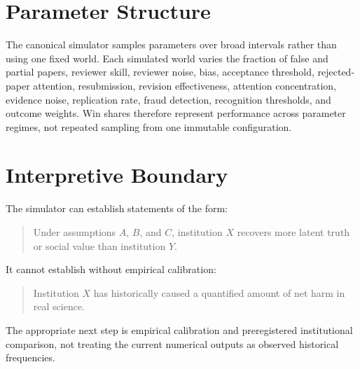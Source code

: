 \documentclass[11pt]{article}
\begin{document}
\appendix
\section{Parameter Structure}

The canonical simulator samples parameters over broad intervals rather than using one fixed world. Each simulated world varies the fraction of false and partial papers, reviewer skill, reviewer noise, bias, acceptance threshold, rejected-paper attention, resubmission, revision effectiveness, attention concentration, evidence noise, replication rate, fraud detection, recognition thresholds, and outcome weights. Win shares therefore represent performance across parameter regimes, not repeated sampling from one immutable configuration.

\section{Interpretive Boundary}

The simulator can establish statements of the form:

\begin{quote}
Under assumptions $A$, $B$, and $C$, institution $X$ recovers more latent truth or social value than institution $Y$.
\end{quote}

It cannot establish without empirical calibration:

\begin{quote}
Institution $X$ has historically caused a quantified amount of net harm in real science.
\end{quote}

The appropriate next step is empirical calibration and preregistered institutional comparison, not treating the current numerical outputs as observed historical frequencies.
\end{document}
